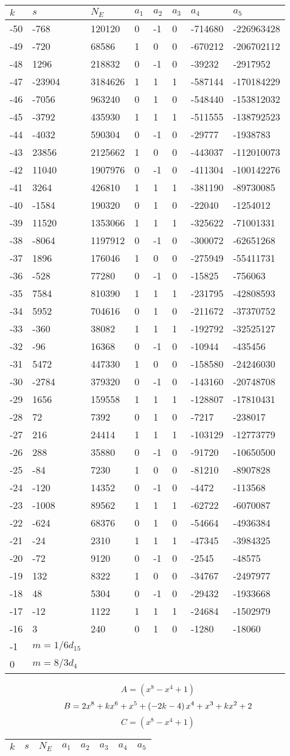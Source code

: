 \documentclass{amsart}
\begin{document}
\begin{longtable}{|l|l|l|lllll|}
\hline
$k$ & $s$ & $N_E$ & $a_1$ & $a_2$ & $a_3$ & $a_4$ & $a_5$\\
\hline
-50&-768&120120&0&-1&0&-714680&-226963428\\
-49&-720&68586&1&0&0&-670212&-206702112\\
-48&1296&218832&0&-1&0&-39232&-2917952\\
-47&-23904&3184626&1&1&1&-587144&-170184229\\
-46&-7056&963240&0&1&0&-548440&-153812032\\
-45&-3792&435930&1&1&1&-511555&-138792523\\
-44&-4032&590304&0&-1&0&-29777&-1938783\\
-43&23856&2125662&1&0&0&-443037&-112010073\\
-42&11040&1907976&0&-1&0&-411304&-100142276\\
-41&3264&426810&1&1&1&-381190&-89730085\\
-40&-1584&190320&0&1&0&-22040&-1254012\\
-39&11520&1353066&1&1&1&-325622&-71001331\\
-38&-8064&1197912&0&-1&0&-300072&-62651268\\
-37&1896&176046&1&0&0&-275949&-55411731\\
-36&-528&77280&0&-1&0&-15825&-756063\\
-35&7584&810390&1&1&1&-231795&-42808593\\
-34&5952&704616&0&1&0&-211672&-37370752\\
-33&-360&38082&1&1&1&-192792&-32525127\\
-32&-96&16368&0&-1&0&-10944&-435456\\
-31&5472&447330&1&0&0&-158580&-24246030\\
-30&-2784&379320&0&-1&0&-143160&-20748708\\
-29&1656&159558&1&1&1&-128807&-17810431\\
-28&72&7392&0&1&0&-7217&-238017\\
-27&216&24414&1&1&1&-103129&-12773779\\
-26&288&35880&0&-1&0&-91720&-10650500\\
-25&-84&7230&1&0&0&-81210&-8907828\\
-24&-120&14352&0&-1&0&-4472&-113568\\
-23&-1008&89562&1&1&1&-62722&-6070087\\
-22&-624&68376&0&1&0&-54664&-4936384\\
-21&-24&2310&1&1&1&-47345&-3984325\\
-20&-72&9120&0&-1&0&-2545&-48575\\
-19&132&8322&1&0&0&-34767&-2497977\\
-18&48&5304&0&-1&0&-29432&-1933668\\
-17&-12&1122&1&1&1&-24684&-1502979\\
-16&3&240&0&1&0&-1280&-18060\\
-1&$m=1/6d_{15}$&&\multicolumn{5}{c|}{}\\
0&$m=8/3d_{4}$&&\multicolumn{5}{c|}{}\\
\hline
\end{longtable}
$$A=(x^8
 - x^4
 + 1)$$
$$B=2\*x^8
 + k\*x^6
 + x^5
 + \left(-2\*k
 - 4\right) \*x^4
 + x^3
 + k\*x^2
 + 2$$
$$C=(x^8
 - x^4
 + 1)$$
\begin{longtable}{|l|l|l|lllll|}
\hline
$k$ & $s$ & $N_E$ & $a_1$ & $a_2$ & $a_3$ & $a_4$ & $a_5$\\
\hline
\hline
\end{longtable}
\end{document}
